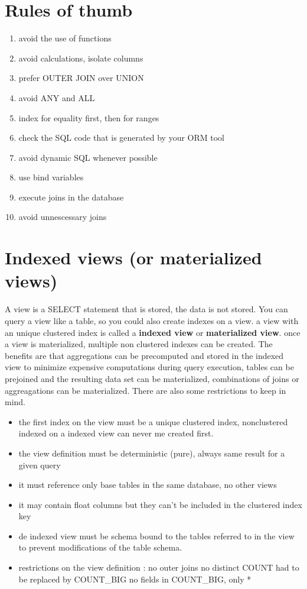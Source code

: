 \documentclass{report}
\begin{document}
		\section{Rules of thumb}
			\begin{enumerate}
				\item avoid the use of functions
				\item avoid calculations, isolate columns
				\item prefer OUTER JOIN over UNION
				\item avoid ANY and ALL
				\item index for equality first, then for ranges
				\item check the SQL code that is generated by your ORM tool
				\item avoid dynamic SQL whenever possible 
				\item use bind variables
				\item execute joins in the database
				\item avoid unnescessary joins
			\end{enumerate}
		\section{Indexed views (or materialized views)}
			A view is a SELECT statement that is stored, the data is not stored. You can query a view like a table, so you could also create indexes on a view. a view with an unique clustered index is called a \textbf{indexed view} or \textbf{materialized view}. once a view is materialized, multiple non clustered indexes can be created. The benefits are that aggregations can be precomputed and stored in the indexed view to minimize expensive computations during query execution, tables can be prejoined and the resulting data set can be materialized, combinations of joins or aggreagations can be materialized. There are also some restrictions to keep in mind.
			\begin{itemize}
				\item the first index on the view must be a unique clustered index, nonclustered indexed on a indexed view can never me created first.
				\item the view definition must be deterministic (pure), always same result for a given query
				\item it must reference only base tables in the same database, no other views
				\item it may contain float columns but they can't be included in the clustered index key
				\item de indexed view must be schema bound to the tables referred to in the view to prevent modifications of the table schema.
				\item restrictions on the view definition : 
					\subitem no outer joins
					\subitem no distinct
					\subitem COUNT had to be replaced by COUNT\_BIG
					\subitem no fields in COUNT\_BIG, only *
			\end{itemize}
\end{document}
